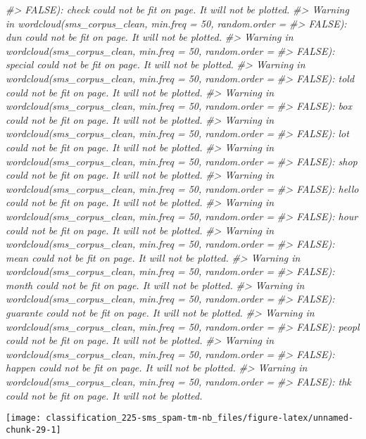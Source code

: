\documentclass[]{book}
\newenvironment{Shaded}{\begin{snugshade}}{\end{snugshade}}
\newcommand{\CommentTok}[1]{\textcolor[rgb]{0.56,0.35,0.01}{\textit{#1}}}
\begin{document}
\begin{Shaded}
\begin{Highlighting}[]
\CommentTok{#> FALSE): check could not be fit on page. It will not be plotted.}
\CommentTok{#> Warning in wordcloud(sms_corpus_clean, min.freq = 50, random.order =}
\CommentTok{#> FALSE): dun could not be fit on page. It will not be plotted.}
\CommentTok{#> Warning in wordcloud(sms_corpus_clean, min.freq = 50, random.order =}
\CommentTok{#> FALSE): special could not be fit on page. It will not be plotted.}
\CommentTok{#> Warning in wordcloud(sms_corpus_clean, min.freq = 50, random.order =}
\CommentTok{#> FALSE): told could not be fit on page. It will not be plotted.}
\CommentTok{#> Warning in wordcloud(sms_corpus_clean, min.freq = 50, random.order =}
\CommentTok{#> FALSE): box could not be fit on page. It will not be plotted.}
\CommentTok{#> Warning in wordcloud(sms_corpus_clean, min.freq = 50, random.order =}
\CommentTok{#> FALSE): lot could not be fit on page. It will not be plotted.}
\CommentTok{#> Warning in wordcloud(sms_corpus_clean, min.freq = 50, random.order =}
\CommentTok{#> FALSE): shop could not be fit on page. It will not be plotted.}
\CommentTok{#> Warning in wordcloud(sms_corpus_clean, min.freq = 50, random.order =}
\CommentTok{#> FALSE): hello could not be fit on page. It will not be plotted.}
\CommentTok{#> Warning in wordcloud(sms_corpus_clean, min.freq = 50, random.order =}
\CommentTok{#> FALSE): hour could not be fit on page. It will not be plotted.}
\CommentTok{#> Warning in wordcloud(sms_corpus_clean, min.freq = 50, random.order =}
\CommentTok{#> FALSE): mean could not be fit on page. It will not be plotted.}
\CommentTok{#> Warning in wordcloud(sms_corpus_clean, min.freq = 50, random.order =}
\CommentTok{#> FALSE): month could not be fit on page. It will not be plotted.}
\CommentTok{#> Warning in wordcloud(sms_corpus_clean, min.freq = 50, random.order =}
\CommentTok{#> FALSE): guarante could not be fit on page. It will not be plotted.}
\CommentTok{#> Warning in wordcloud(sms_corpus_clean, min.freq = 50, random.order =}
\CommentTok{#> FALSE): peopl could not be fit on page. It will not be plotted.}
\CommentTok{#> Warning in wordcloud(sms_corpus_clean, min.freq = 50, random.order =}
\CommentTok{#> FALSE): happen could not be fit on page. It will not be plotted.}
\CommentTok{#> Warning in wordcloud(sms_corpus_clean, min.freq = 50, random.order =}
\CommentTok{#> FALSE): thk could not be fit on page. It will not be plotted.}
\end{Highlighting}
\end{Shaded}

\begin{center}\texttt{[image: classification\_225-sms\_spam-tm-nb\_files/figure-latex/unnamed-chunk-29-1]} \end{center}
\end{document}
